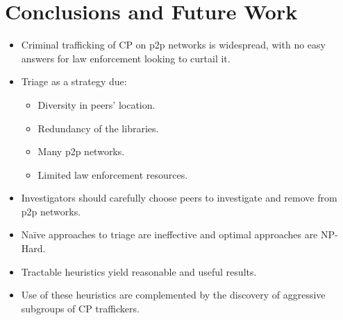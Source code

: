 \documentclass[notes]{beamer}
\begin{document}
\section{Conclusions and Future Work}
\begin{frame}

\begin{itemize}

\item[\checkmark]Criminal trafficking of CP on p2p networks is
widespread, with no easy answers for law enforcement looking
to curtail it.

\item[\checkmark]Triage as a strategy due:

	\begin{itemize}

	\item Diversity in peers’ location.
	\item Redundancy of the libraries.
	\item Many p2p networks.
	\item Limited law enforcement resources.
	
	\end{itemize}


\item[\checkmark]Investigators should carefully choose peers
to investigate and remove from p2p networks.

\end{itemize}

\end{frame}

\begin{frame}

\begin{itemize}

\item[\checkmark]Naïve approaches to triage are ineffective and optimal approaches are NP-Hard.

\item[\checkmark]Tractable heuristics yield reasonable and useful results.

\item[\checkmark]Use of these heuristics are complemented by the
discovery of aggressive subgroups of CP traffickers.

\end{itemize}

\end{frame}
\end{document}
